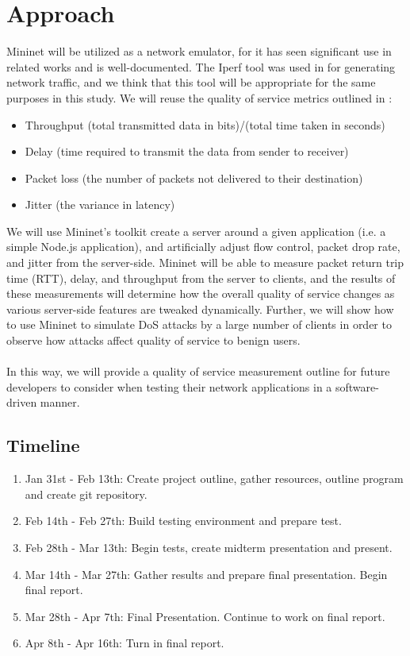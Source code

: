 \documentclass{article}
\begin{document}
\section{Approach}
Mininet will be utilized as a network emulator, for it has seen significant use in related works \cite{mininet_emulation_2014,qos_analysis_2022,chauhan_atulkar_2020} and 
is well-documented. The Iperf tool was used in \cite{chauhan_atulkar_2020} for generating network traffic, and we think that this tool will be appropriate for the same 
purposes in this study. We will reuse the quality of service metrics outlined in \cite{qos_analysis_2022}: 
\begin{itemize}
    \item Throughput (total transmitted data in bits)/(total time taken in seconds)
    \item Delay (time required to transmit the data from sender to receiver)
    \item Packet loss (the number of packets not delivered to their destination)
    \item Jitter (the variance in latency)
\end{itemize} 
We will use Mininet's toolkit create a server around a given application (i.e. a simple Node.js application), and artificially adjust flow control, packet drop rate, 
and jitter from the server-side. Mininet will be able to measure packet return trip time (RTT), delay, and throughput from the server to clients, and the results of 
these measurements will determine how the overall quality of service changes as various server-side features are tweaked dynamically. Further, we will show how to use 
Mininet to simulate DoS attacks by a large number of clients in order to observe how attacks affect quality of service to benign users. \\\\
In this way, we will provide a quality of service measurement outline for future developers to consider when testing their network applications in a software-driven 
manner. 

\subsection{Timeline}
\begin{enumerate}
    \item Jan 31st - Feb 13th: Create project outline, gather resources, outline program and create git repository.
    \item Feb 14th - Feb 27th: Build testing environment and prepare test.
    \item Feb 28th - Mar 13th: Begin tests, create midterm presentation and present. 
    \item Mar 14th - Mar 27th: Gather results and prepare final presentation. Begin final report.
    \item Mar 28th - Apr 7th: Final Presentation. Continue to work on final report.
    \item Apr 8th - Apr 16th: Turn in final report.
\end{enumerate}
\end{document}
